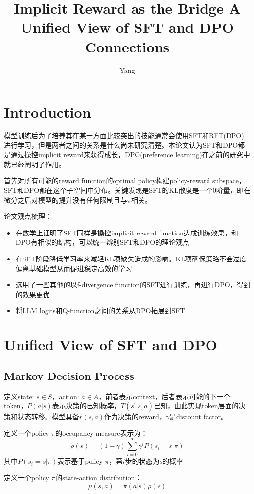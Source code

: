 \documentclass[a4paper,12pt]{article}
\title{Implicit Reward as the Bridge A Unified View of SFT and DPO Connections}
\author{Yang}
\begin{document}
\maketitle

\section{Introduction}
模型训练后为了培养其在某一方面比较突出的技能通常会使用SFT和RFT(DPO)进行学习，但是两者之间的关系是什么尚未研究清楚。本论文认为SFT和DPO都是通过操控implicit reward来获得成长，DPO(preference learning)在之前的研究中就已经阐明了作用。

首先对所有可能的reward function的optimal policy构建policy-reward subspace，SFT和DPO都在这个子空间中分布。关键发现是SFT的KL散度是一个0阶量，即在微分之后对模型的提升没有任何限制且与$\pi$相关。

论文观点梳理：
\begin{itemize}
    \item 在数学上证明了SFT同样是操控implicit reward function达成训练效果，和DPO有相似的结构，可以统一辨别SFT和DPO的理论观点
    \item 在SFT阶段降低学习率来减轻KL项缺失造成的影响。KL项确保策略不会过度偏离基础模型从而促进稳定高效的学习
    \item 选用了一些其他的以f-divergence function的SFT进行训练，再进行DPO，得到的效果更优
    \item 将LLM logits和Q-function之间的关系从DPO拓展到SFT
\end{itemize}

\section{Unified View of SFT and DPO}
\subsection{Markov Decision Process}
定义state: $s \in S$，action: $a \in A$，前者表示context，后者表示可能的下一个token，$P(a|s)$表示决策的已知概率，$T(s^\prime|s, a)$已知，由此实现token层面的决策和状态转移。模型具备$r(s, a)$作为决策的reward，$\gamma$是discount factor。

定义一个policy $\pi$的occupancy measure表示为：
\[
    \rho(s) = (1-\gamma)\sum_{i=0}^{\infty}\gamma^iP(s_i=s|\pi)
\]
其中$P(s_i=s|\pi)$表示基于policy $\pi$，第$i$步的状态为$s$的概率

定义一个policy $\pi$的state-action distribution：
\[
    \mu(s, a) = \pi(a|s)\rho(s)
\]
\end{document}
